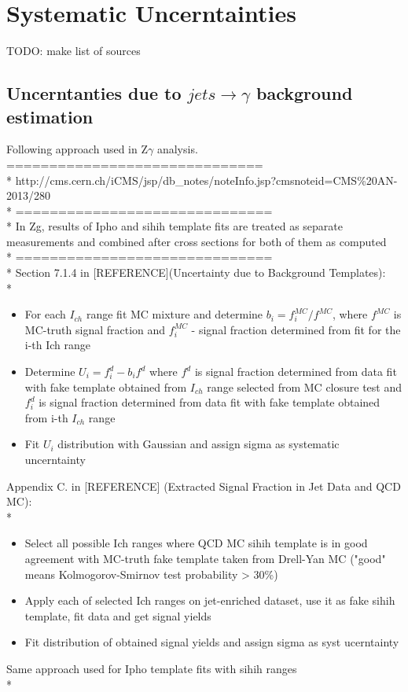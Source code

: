 \section{Systematic Uncerntainties}
\label{sec:Systematics}
TODO: make list of sources
\subsection{Uncerntanties due to $jets \rightarrow \gamma$ background estimation}
Following approach used in Z$\gamma$ analysis. 
==============================\\*
http://cms.cern.ch/iCMS/jsp/db\_notes/noteInfo.jsp?cmsnoteid=CMS\%20AN-2013/280\\*
==============================\\*
In Zg, results of Ipho and sihih template fits are treated as separate measurements and combined after cross sections for both of them as computed\\*
==============================\\*
Section 7.1.4 in [REFERENCE](Uncertainty due to Background Templates):\\*
    \begin{itemize}
      \item For each $I_{ch}$ range fit MC mixture and determine $b_{i}=f_{i}^{MC}/f^{MC}$, where $f^{MC}$ is MC-truth signal fraction and $f_{i}^{MC}$ - signal fraction determined from fit for the i-th Ich range
      \item Determine $U_{i}=f_{i}^{d}-b_{i}f^{d}$ where $f^{d}$ is signal fraction determined from data fit with fake template obtained from $I_{ch}$ range selected from MC closure test and $f_{i}^{d}$ is signal fraction determined from data fit with fake template obtained from i-th $I_{ch}$ range
      \item Fit $U_{i}$ distribution with Gaussian and assign sigma as systematic uncerntainty
    \end{itemize}
Appendix C. in [REFERENCE] (Extracted Signal Fraction in Jet Data and QCD MC):\\*
    \begin{itemize}
      \item Select all possible Ich ranges where QCD MC sihih template is in good agreement with MC-truth fake template taken from Drell-Yan MC ("good" means Kolmogorov-Smirnov test probability > 30\%)  
      \item Apply each of selected Ich ranges on jet-enriched dataset, use it as fake sihih template, fit data and get signal yields   
      \item Fit distribution of obtained signal yields and assign sigma as syst ucerntainty 
    \end{itemize}
Same approach used for Ipho template fits with sihih ranges\\*

